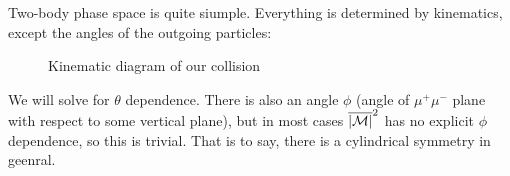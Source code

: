 Two-body phase space is quite siumple. Everything is determined by kinematics, except the angles of the outgoing particles:
\begin{figure}[H]
  \centering
  \caption{Kinematic diagram of our collision}\label{fig:kinematics}
\end{figure}


\begin{remark}
  We will solve for $\theta$ dependence. There is also an angle $\phi$ (angle of $\mu^+\mu^-$ plane with respect to some vertical plane), but in most cases $\overline{\abs{\mathcal{M}}}^2$ has no explicit $\phi$ dependence, so this is trivial. That is to say, there is a cylindrical symmetry in geenral.
\end{remark}

